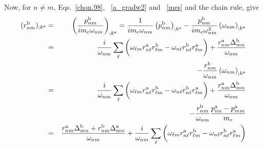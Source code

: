 \documentclass[floatfix,prb,aps,superscriptaddress,11pt,preprint]{revtex4}
\begin{document}
Now, for $n \ne m$, Eqs.~\eqref{chon.98},
~\eqref{a_gradw2} and 
~\eqref{mes} and the chain rule, give
\begin{eqnarray}\label{a_rgendevn}
(r^{\mathrm{b}}_{nm})_{;k^{\mathrm{a}}}&=&\left(\frac{p^{\mathrm{b}}_{nm}}{im_e\omega_{nm}}\right)_{;k^{\mathrm{a}}}
=
\frac{1}
{im_e\omega_{nm}}
\left(
p^{\mathrm{b}}_{nm}
\right)_{;k^{\mathrm{a}}}
-
\frac{p^{\mathrm{b}}_{nm}}
{im_e\omega^2_{nm}}
\left(
\omega_{nm}
\right)_{;k^{\mathrm{a}}}
\nonumber \\
&=&
\frac{i}{\omega_{nm}}
\sum_{\ell}
\bigg(
\omega_{\ell m}
r^{\mathrm{a}}_{n\ell}
r^{\mathrm{b}}_{\ell m}
-
\omega_{n\ell}
r^{\mathrm{b}}_{n\ell}
r^{\mathrm{a}}_{\ell m}
\bigg)
+
\frac{r^{\mathrm{a}}_{nm}
\Delta^{\mathrm{b}}_{mn}}
{\omega_{nm}}
\nonumber \\
&&
-
\frac{r^{\mathrm{b}}_{nm}}
{\omega_{nm}}
\left(
\omega_{nm}
\right)_{;k^{\mathrm{a}}}
\nonumber \\
&=&
\frac{i}{\omega_{nm}}
\sum_{\ell}
\bigg(
\omega_{\ell m}
r^{\mathrm{a}}_{n\ell}
r^{\mathrm{b}}_{\ell m}
-
\omega_{n\ell}
r^{\mathrm{b}}_{n\ell}
r^{\mathrm{a}}_{\ell m}
\bigg)
+
\frac{r^{\mathrm{a}}_{nm}
\Delta^{\mathrm{b}}_{mn}}
{\omega_{nm}}
\nonumber \\
&&
-
\frac{r^{\mathrm{b}}_{nm}}
{\omega_{nm}}
\frac{p^{\mathrm{a}}_{nn}-p^{\mathrm{a}}_{mm}}{m_e}
\nonumber \\
&=&
\frac{
r^{\mathrm{a}}_{nm}
\Delta^{\mathrm{b}}_{mn}
+r^{\mathrm{b}}_{nm}
\Delta^{\mathrm{a}}_{mn}
}
{\omega_{nm}}
+
\frac{i}{\omega_{nm}}
\sum_{\ell}
\bigg(
\omega_{\ell m}
r^{\mathrm{a}}_{n\ell}
r^{\mathrm{b}}_{\ell m}
-
\omega_{n\ell}
r^{\mathrm{b}}_{n\ell}
r^{\mathrm{a}}_{\ell m}
\bigg)
\end{eqnarray}
\end{document}
